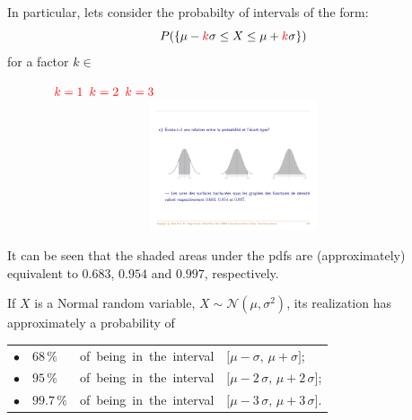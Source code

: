 \documentclass[smaller]{beamer}\usepackage[]{graphicx}\usepackage[]{color}
\newcommand{\N}{\mathcal{N}}
\begin{document}
\begin{frame}{\secname}
  In particular, lets consider the probabilty of intervals of the form:
  $$P(\{\mu-\textcolor{red}{k} \sigma \leq X  \leq \mu+\textcolor{red}{k} \sigma\})$$
  for a factor $k \in $
  \begin{figure}[ptb]\centering
  \ \hspace{0.6cm} $\color{red}{k=1}$ \hspace{2.4cm} $\color{red}{k=2}$ \hspace{2.5cm} $\color{red}{k=3}$ \hspace{3cm}
  \includegraphics[height=1.5in, width=4.5in]{img/Areas_Normal.pdf}%
  \end{figure}%
  It can be seen that the shaded areas under the pdfs are (approximately) equivalent to $\mathbf{0.683}$, $\mathbf{0.954}$ and $\mathbf{0.997}$,
  respectively.
\end{frame}

\begin{frame}{\secname}

  \begin{definition}[Rule `68 -- 95 -- 99.7']
  If $X$ is a Normal random variable, $X \sim \N(\mu, \sigma^2)$, its realization has approximately a probability of \\ \bigskip

  \begin{tabular}{llll}
  $\bullet$
  &
  $68 \, \%$
  &
  \mbox{of being in the interval}
  &
  $\lbrack \mu - \sigma, \, \mu + \sigma \rbrack$;\\[0.2cm]
  $\bullet$
  &
  $95 \, \%$
  &
  \mbox{of being in the interval}
  &
  $\lbrack \mu - 2 \, \sigma, \, \mu + 2 \, \sigma \rbrack$;\\[0.2cm]
  $\bullet$
  &
  $99.7 \, \%$
  &
  \mbox{of being in the interval}&
  $\lbrack \mu - 3 \, \sigma, \, \mu + 3 \, \sigma \rbrack$.\\[0.2cm]
  \end{tabular}
  \end{definition}
\end{frame}
\end{document}

